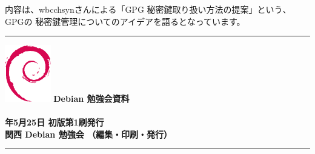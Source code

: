 \documentclass[mingoth,a4paper]{jsarticle}
\newcommand{\debmtgyear}{2014}
\newcommand{\debmtgdate}{25}
\newcommand{\debmtgmonth}{5}
\begin{document}
内容は、wbcchsynさんによる「GPG 秘密鍵取り扱い方法の提案」という、GPGの
秘密鍵管理についてのアイデアを語るとなっています。

%
\mbox{}\newpage

\printindex

 \begin{minipage}[b]{0.2\hsize}
 \end{minipage}
 \begin{minipage}[b]{0.8\hsize}

 \vspace*{15cm}
 \rule{\hsize}{1mm}
 \vspace{2mm}
 \includegraphics[width=2cm]{image200502/openlogo-nd.eps}
 \noindent \Large \bfseries{Debian 勉強会資料}\\ \\
 \noindent \normalfont \debmtgyear{}年\debmtgmonth{}月\debmtgdate{}日 \hspace{5mm}  初版第1刷発行\\
 \noindent \normalfont 関西 Debian 勉強会 （編集・印刷・発行）\\
 \rule{\hsize}{1mm}
 \end{minipage}
\end{document}
